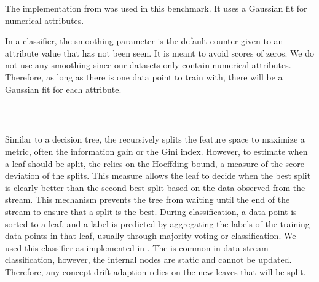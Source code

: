 The implementation from \streamdmcpp was used in this
benchmark. It uses a Gaussian
fit for numerical attributes. 

In a \naivebayes classifier, the smoothing parameter is the
default counter given to an attribute value that
has not been seen. It is meant to avoid scores of zeros.
We do not use any smoothing since our datasets
only contain numerical
attributes. Therefore, as long as there is one data
point to train with, there will be a Gaussian
fit for each attribute.

\subsubsection{\hoeffdingtree~\cite{VFDT}}
Similar to a decision tree, the \hoeffdingtree
recursively splits the feature space to maximize a metric, often the
information gain or the Gini
index. However,  to estimate when a leaf should be
split, the \hoeffdingtree relies on the
Hoeffding bound, a measure of the score deviation
of the splits. This measure allows the leaf to
decide when the best split is clearly better than
the second best split based on the data observed
from the stream. This mechanism prevents the tree
from waiting until the end of the stream
to ensure that a split is the best.
During classification, a data point
is sorted to a leaf, and a label is predicted by
aggregating the labels of the training data points
in that leaf, usually through majority voting or
\naivebayes classification.  We used this
classifier as implemented in \streamdmcpp.  The
\hoeffdingtree is common in data stream
classification, however, the internal nodes are
static and cannot be updated. Therefore, any
concept drift adaption relies on the new leaves
that will be split.

